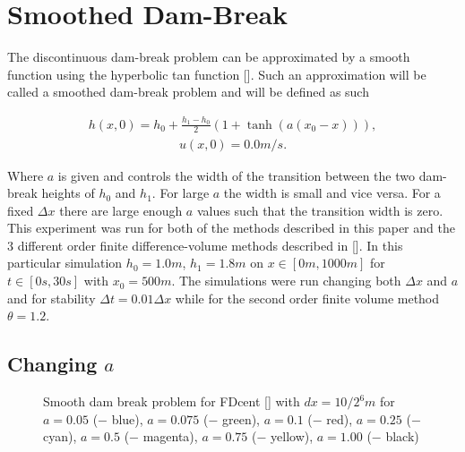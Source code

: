 \documentclass[SingleSpace,12pt,Proceedings]{Serre_ASCE}
\begin{document}
\section{Smoothed Dam-Break}
\label{section:smootheddambreak}
The discontinuous dam-break problem can be approximated by a smooth function using the hyperbolic tan function []. Such an approximation will be called a smoothed dam-break problem and will be defined as such
\begin{linenomath*}
\begin{gather*}
h(x,0) = h_0 + \frac{h_1 - h_0}{2}\left(1 + \tanh\left(a\left(x_0 - x\right)\right)\right),
\end{gather*}
\begin{gather*}
u(x,0) = 0.0m/s.
\end{gather*}
\end{linenomath*}
Where $a$ is given and controls the width of the transition between the two dam-break heights of $h_0$ and $h_1$. For large $a$ the width is small and vice versa. For a fixed $\Delta x$ there are large enough $a$ values such that the transition width is zero. This experiment was run for both of the methods described in this paper and the 3 different order finite difference-volume methods described in []. In this particular simulation $h_0 = 1.0m$, $h_1 = 1.8m$ on $x \in [0m,1000m]$ for $t \in [0s,30s]$ with $x_0 = 500m$. The simulations were run changing both $\Delta x$ and $a$ and for stability $\Delta t = 0.01 \Delta x$ while for the second order finite volume method $\theta = 1.2$.


\subsection{Changing $a$}

\begin{figure}
\centering
{}
\caption{Smooth dam break problem for FDcent [] with $dx = 10 / 2^6 m$ for $a = 0.05$ ($-$ blue), $a = 0.075$ ($-$ green), $a = 0.1$ ($-$ red), $a = 0.25$ ($-$ cyan), $a = 0.5$ ($-$ magenta), $a = 0.75$ ($-$ yellow), $a = 1.00$ ($-$ black)}
\label{fig:FDcentdx6normdiff}
\end{figure}
\end{document}
